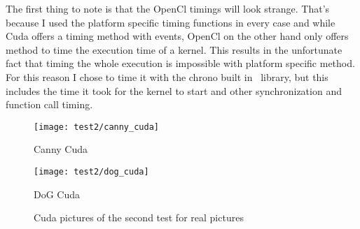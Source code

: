 \begin{table}[H]
\centering
{}
\caption{Timings of the first test for real pictures}
\label{tab:test1c}
\end{table}


The first thing to note is that the OpenCl timings will look strange. That's because I used the platform specific timing functions in every case and while Cuda offers a timing method with events, OpenCl on the other hand only offers method to time the execution time of a kernel. This results in the unfortunate fact that timing the whole execution is impossible with platform specific method. For this reason I chose to time it with the chrono built in \CC\ library, but this includes the time it took for the kernel to start and other synchronization and function call timing.


\begin{figure}[H]
\centering

\begin{minipage}[t]{.49\textwidth}
\centering
\texttt{[image: test2/canny\_cuda]}
\addtocounter{figure}{-1}
\captionsetup{labelformat=empty}
\caption[]{Canny Cuda}
\end{minipage}
\begin{minipage}[t]{.49\textwidth}
\centering
\texttt{[image: test2/dog\_cuda]}
\addtocounter{figure}{-1}
\captionsetup{labelformat=empty}
\caption[]{DoG Cuda}
\end{minipage}
\caption{Cuda pictures of the second test for real pictures}
\label{fig:test2c}
\end{figure}


